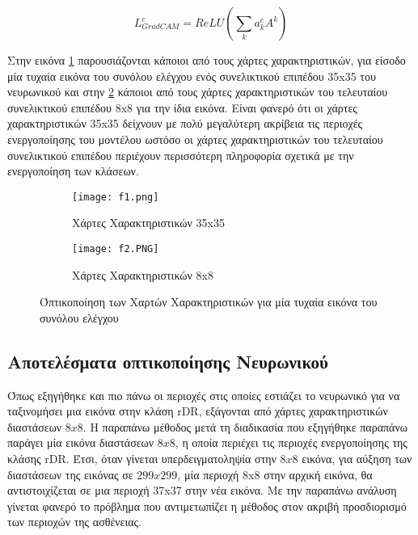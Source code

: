 \begin{equation} \label{eq:7.11}
L_{GradCAM}^c =  ReLU(\sum_{k} a_{k}^c  A^k)
\end{equation}

 Στην εικόνα \ref{fig:fm1} παρουσιάζονται κάποιοι από τους  χάρτες χαρακτηριστικών, για είσοδο μία τυχαία εικόνα του συνόλου ελέγχου ενός συνελικτικού επιπέδου 35x35 του νευρωνικού και στην \ref{fig:fm2}  κάποιοι από τους χάρτες χαρακτηριστικών του τελευταίου συνελικτικού επιπέδου 8x8 για την ίδια εικόνα. Είναι φανερό ότι οι χάρτες χαρακτηριστικών 35x35 δείχνουν με πολύ μεγαλύτερη ακρίβεια τις περιοχές ενεργοποίησης του μοντέλου ωστόσο οι χάρτες χαρακτηριστικών του τελευταίου συνελικτικού επιπέδου περιέχουν περισσότερη πληροφορία σχετικά με την ενεργοποίηση των κλάσεων. 




\begin{figure}[!h]
\centering
\begin{subfigure}{.5\textwidth}
  \centering
  \texttt{[image: f1.png]}
  \caption{Χάρτες Χαρακτηριστικών 35x35}
  \label{fig:fm1}
\end{subfigure}
\begin{subfigure}{.5\textwidth}
  \centering
  \texttt{[image: f2.PNG]}
  \caption{Χάρτες Χαρακτηριστικών 8x8}
  \label{fig:fm2}
\end{subfigure}
\caption{Όπτικοποίηση των Χαρτών Χαρακτηριστικών για μία τυχαία εικόνα του συνόλου ελέγχου}
\label{figure:fm}
\end{figure}




\subsection{ Αποτελέσματα οπτικοποίησης Νευρωνικού} 
\label{sec:7.1.3}

Όπως εξηγήθηκε και πιο πάνω οι περιοχές στις οποίες εστιάζει το νευρωνικό για να ταξινομήσει μια εικόνα στην κλάση rDR, εξάγονται από χάρτες χαρακτηριστικών διαστάσεων $8x8$. H παραπάνω μέθοδος μετά τη διαδικασία που εξηγήθηκε παραπάνω παράγει μία εικόνα διαστάσεων $8x8$, η οποία περιέχει τις περιοχές ενεργοποίησης της κλάσης rDR.
Έτσι, όταν γίνεται υπερδειγματοληψία στην  $8x8$ εικόνα, για αύξηση των διαστάσεων της εικόνας σε $299x299$, μία περιοχή 8x8 στην αρχική εικόνα, θα αντιστοιχίζεται σε μια περιοχή 37x37 στην νέα εικόνα. Με την παραπάνω ανάλυση γίνεται φανερό το πρόβλημα που αντιμετωπίζει η μέθοδος στον ακριβή προσδιορισμό των περιοχών της ασθένειας. 

